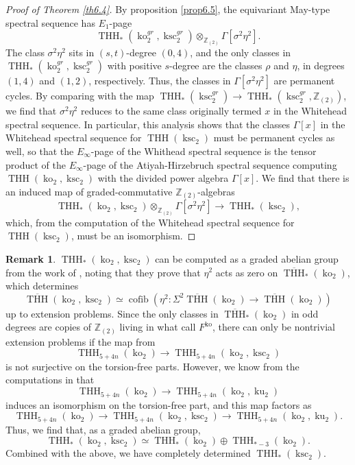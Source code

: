 \documentclass[11pt,leqno]{article}
\newcommand{\zz}{\mathbb{Z}}
\DeclareMathOperator{\THH}{THH}
\DeclareMathOperator{\cofib}{cofib}
\DeclareMathOperator{\ksc}{ksc}
\DeclareMathOperator{\ko}{ko}
\newcommand{\mo}[1]{\operatorname{#1}}
\newtheorem*{short hand}{theorem name}
\theoremstyle{plain}  %
\theoremstyle{definition}
\newtheorem{remark}{Remark}[section]
\numberwithin{equation}{section}
\begin{document}
\begin{proof}[Proof of Theorem \ref{th6.4}]
By proposition \ref{prop6.5}, the equivariant May-type spectral sequence has $E_1$-page $$\THH_*(\ko_2^{gr},\ksc_2^{gr})\otimes_{\zz_{(2)}}\Gamma[\sigma^2\eta^2].$$  The class $\sigma^2\eta^2$ sits in $(s,t)$-degree $(0,4)$, and the only classes in $\THH_*(\ko_2^{gr},\ksc_2^{gr})$ with positive $s$-degree are the classes $\rho$ and $\eta$, in degrees $(1,4)$ and $(1,2)$, respectively.  Thus, the classes in $\Gamma[\sigma^2\eta^2]$ are permanent cycles.  By comparing with the map $\THH_*(\ksc_2^{gr})\to\THH_*(\ksc_2^{gr},\zz_{(2)})$, we find that $\sigma^2\eta^2$ reduces to the same class originally termed $x$ in the Whitehead spectral sequence.  In particular, this analysis shows that the classes $\Gamma[x]$ in the Whitehead spectral sequence for $\THH(\ksc_2)$ must be permanent cycles as well, so that the $E_{\infty}$-page of the Whithead spectral sequence is the tensor product of the $E_{\infty}$-page of the Atiyah-Hirzebruch spectral sequence computing $\THH(\ko_2,\ksc_2)$ with the divided power algebra $\Gamma[x]$.  We find that there is an induced map of graded-commutative $\zz_{(2)}$-algebras $$\THH_*(\ko_2,\ksc_2)\otimes_{\zz_{(2)}}\Gamma[\sigma^2\eta^2]\to\THH_*(\ksc_2),$$ which, from the computation of the Whitehead spectral sequence for $\THH(\ksc_2)$, must be an isomorphism.
\end{proof}

\begin{remark}\label{rem6.7}
	$\THH_*(\ko_2,\ksc_2)$ can be computed as a graded abelian group from the work of \cite{angeltveit2009topological}, noting that they prove that $\eta^2$ acts as zero on $\overline{\THH}_*(\ko_2)$, which determines $$\overline{\THH}(\ko_2,\ksc_2)\simeq\cofib(\eta^2:\Sigma^2\overline{\THH}(\ko_2)\to\overline{\THH}(\ko_2))$$ up to extension problems.  Since the only classes in $\overline{\THH}_*(\ko_2)$ in odd degrees are copies of $\zz_{(2)}$ living in what \cite{angeltveit2009topological} call $F^{\ko}$, there can only be nontrivial extension problems if the map from $$\THH_{5+4n}(\ko_2)\to\THH_{5+4n}(\ko_2,\ksc_2)$$ is not surjective on the torsion-free parts.  However, we know from the computations in \cite[~-7.3]{angeltveit2009topological}  that $$\THH_{5+4n}(\ko_2)\to\THH_{5+4n}(\ko_2,\mo{ku}_2)$$ induces an isomorphism on the torsion-free part, and this map factors as $$\THH_{5+4n}(\ko_2)\to\THH_{5+4n}(\ko_2,\ksc_2)\to\THH_{5+4n}(\ko_2,\mo{ku}_2).$$  Thus, we find that, as a graded abelian group, $$\THH_*(\ko_2,\ksc_2)\simeq \THH_*(\ko_2)\oplus \THH_{*-3}(\ko_2).$$  Combined with the above, we have completely determined $\THH_*(\ksc_2)$.
\end{remark}


\newpage
\printbibliography
\end{document}

